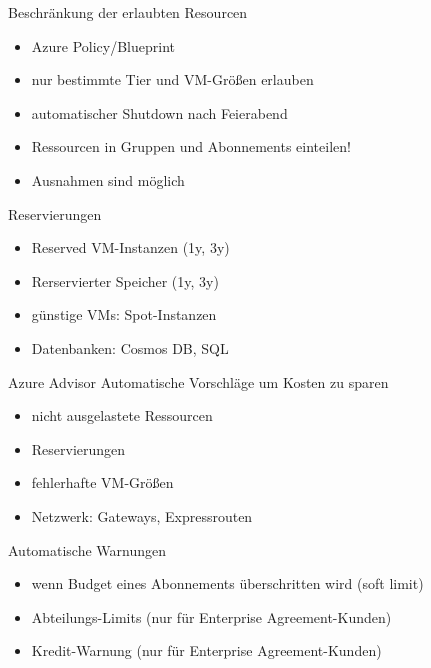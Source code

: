 \begin{flashcard}[Definition]{Beschränkung der erlaubten Resourcen}
  \begin{itemize}
    \item Azure Policy/Blueprint
    \item nur bestimmte Tier und VM-Größen erlauben
    \item automatischer Shutdown nach Feierabend
    \item Ressourcen in Gruppen und Abonnements einteilen!
    \item Ausnahmen sind möglich
  \end{itemize}
\end{flashcard}

\begin{flashcard}[Definition]{Reservierungen}
  \begin{itemize}
    \item Reserved VM-Instanzen (1y, 3y)
    \item Rerservierter Speicher (1y, 3y)
    \item günstige VMs: Spot-Instanzen
    \item Datenbanken: Cosmos DB, SQL
  \end{itemize}
\end{flashcard}

\begin{flashcard}[Definition]{Azure Advisor}
  Automatische Vorschläge um Kosten zu sparen
  \begin{itemize}
    \item nicht ausgelastete Ressourcen
    \item Reservierungen
    \item fehlerhafte VM-Größen
    \item Netzwerk: Gateways, Expressrouten
  \end{itemize}
\end{flashcard}

\begin{flashcard}[Definition]{Automatische Warnungen}
  
  \begin{itemize}
    \item wenn Budget eines Abonnements überschritten wird (soft limit)
    \item Abteilungs-Limits (nur für Enterprise Agreement-Kunden)
    \item Kredit-Warnung (nur für Enterprise Agreement-Kunden)
  \end{itemize}
\end{flashcard}
